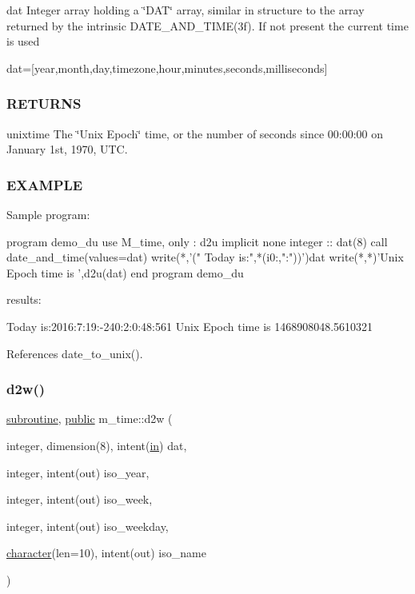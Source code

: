 dat Integer array holding a \char`\"{}\+D\+A\+T\char`\"{} array, similar in structure to the array returned by the intrinsic D\+A\+T\+E\+\_\+\+A\+N\+D\+\_\+\+T\+I\+M\+E(3f). If not present the current time is used

dat=\mbox{[}year,month,day,timezone,hour,minutes,seconds,milliseconds\mbox{]}

\subsubsection*{R\+E\+T\+U\+R\+NS}

unixtime The \char`\"{}\+Unix Epoch\char`\"{} time, or the number of seconds since 00\+:00\+:00 on January 1st, 1970, U\+TC.

\subsubsection*{E\+X\+A\+M\+P\+LE}

\begin{DoxyVerb}Sample program:

 program demo_du
 use M_time, only : d2u
 implicit none
 integer           :: dat(8)
    call date_and_time(values=dat)
    write(*,'(" Today is:",*(i0:,":"))')dat
    write(*,*)'Unix Epoch time is ',d2u(dat)
 end program demo_du

results:

 Today is:2016:7:19:-240:2:0:48:561
 Unix Epoch time is    1468908048.5610321 \end{DoxyVerb}
 

References date\+\_\+to\+\_\+unix().

\mbox{\label{namespacem__time_ad4ff99ad6f6d5282c4b65ad636a2a627}} 
\subsubsection{\texorpdfstring{d2w()}{d2w()}}
{\footnotesize\ttfamily \hyperlink{M__stopwatch_83_8txt_acfbcff50169d691ff02d4a123ed70482}{subroutine}, \hyperlink{M__stopwatch_83_8txt_a2f74811300c361e53b430611a7d1769f}{public} m\+\_\+time\+::d2w (\begin{DoxyParamCaption}\item[{integer, dimension(8), intent(\hyperlink{M__journal_83_8txt_afce72651d1eed785a2132bee863b2f38}{in})}]{dat,  }\item[{integer, intent(out)}]{iso\+\_\+year,  }\item[{integer, intent(out)}]{iso\+\_\+week,  }\item[{integer, intent(out)}]{iso\+\_\+weekday,  }\item[{\hyperlink{option__stopwatch_83_8txt_abd4b21fbbd175834027b5224bfe97e66}{character}(len=10), intent(out)}]{iso\+\_\+name }\end{DoxyParamCaption})}



